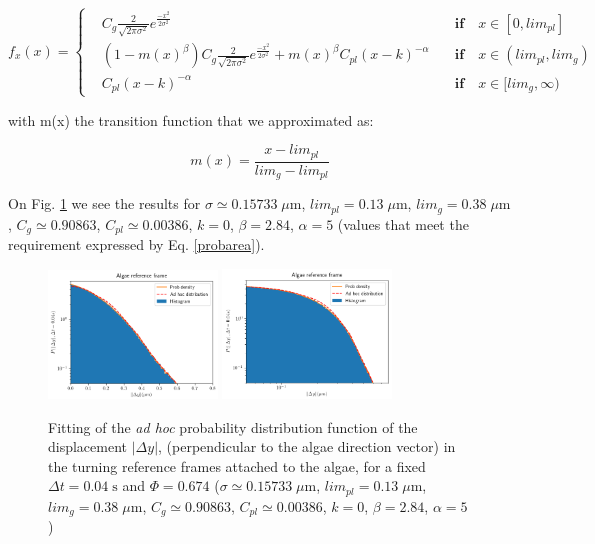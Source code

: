 \begin{equation}
f_x(x) = \left\{
\begin{aligned}
& C_g \frac{2}{\sqrt{2 \pi \sigma^2}} e^{\frac{-x^2}{2 \sigma^2}} & \quad \textbf{if} \quad x \in [0, lim_{pl}]\\ 
& (1-m(x)^\beta) C_g \frac{2}{\sqrt{2 \pi \sigma^2}} e^{\frac{-x^2}{2 \sigma^2}} + m(x)^\beta C_{pl} (x-k)^{-\alpha} & \quad \textbf{if} \quad x \in (lim_{pl}, lim_g)\\
& C_{pl} (x-k)^{-\alpha} & \quad \textbf{if} \quad x \in [lim_g,\infty)
\end{aligned}
\right.
\end{equation}

with m(x) the transition function that we approximated as:

\begin{equation}
m(x) = \frac{x-lim_{pl}}{lim_g-lim_{pl}}
\end{equation}

On Fig. \ref{e3_adhoc} we see the results for $\sigma \simeq 0.15733 \; \mu \textrm{m}$, $lim_{pl}=0.13 \; \mu \textrm{m}$, $lim_g=0.38 \; \mu \textrm{m}$, $C_g \simeq 0.90863$, $C_{pl} \simeq 0.00386$, $k = 0$, $\beta = 2.84$, $\alpha = 5$ (values that meet the requirement expressed by Eq. \ref{probarea}).

\begin{figure}[H]
	\centering
	\includegraphics[width=0.4\textwidth]{archivos/pdf_ylog_e3.png}
	\includegraphics[width=0.4\textwidth]{archivos/pdf_loglog_e3.png}
	\caption{Fitting of the \textit{ad hoc} probability distribution function of the displacement $|\Delta y|$, (perpendicular to the algae direction vector) in the turning reference frames attached to the algae, for a fixed $\Delta t = 0.04 \; \textrm{s}$ and $\Phi = 0.674$ ($\sigma \simeq 0.15733 \; \mu \textrm{m}$, $lim_{pl}=0.13 \; \mu \textrm{m}$, $lim_g=0.38 \; \mu \textrm{m}$, $C_g \simeq 0.90863$, $C_{pl} \simeq 0.00386$, $k = 0$, $\beta = 2.84$, $\alpha = 5$)}
	\label{e3_adhoc}
\end{figure}

